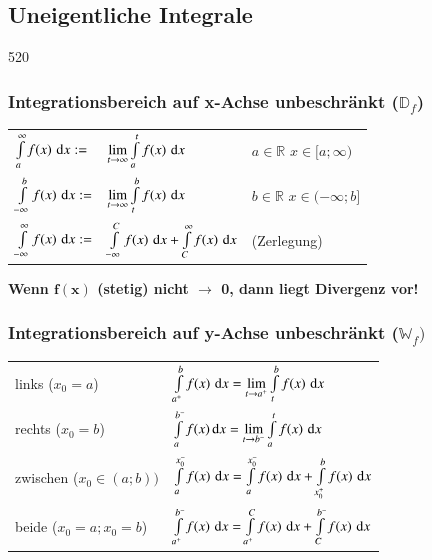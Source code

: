\subsection{Uneigentliche Integrale}{520}

\subsubsection{Integrationsbereich auf x-Achse unbeschränkt ($\mathbb{D}_f$)}

\vspace{-0.2cm}

\renewcommand{\arraystretch}{2.3}
\begin{tabular}{lll}
    $\int \limits_a^{\infty} f(x) \, \mathop{} \! \mathrm{d} x :=$            & $\lim \limits_{t \rightarrow \infty} \int \limits_a^t f(x) \, \mathop{} \! \mathrm{d} x$                    & $a \in \mathbb{R}$ \quad $x \in [a; \infty)$      \\
    $\int \limits_{- \infty}^{b} f(x) \, \mathop{} \! \mathrm{d} x :=$        & $\lim \limits_{t \rightarrow \infty} \int \limits_t^b f(x) \, \mathop{} \! \mathrm{d} x$                    & $b \in \mathbb{R}$ \quad $x \in (- \infty; b]$    \\
    $\int \limits_{- \infty}^{\infty} f(x) \, \mathop{} \! \mathrm{d} x :=$   & $\int \limits_{- \infty}^{C} f(x) \, \mathop{} \! \mathrm{d} x + \int \limits_{C}^{\infty} f(x) \, \mathop{} \! \mathrm{d} x$ & (Zerlegung)
\end{tabular}
\renewcommand{\arraystretch}{1}

\textbf{Wenn $\bm{f(x)}$ (stetig) nicht $\bm{\rightarrow}$ 0, dann liegt Divergenz vor!}


\subsubsection{Integrationsbereich auf y-Achse unbeschränkt ($\mathbb{W}_f)$}

\vspace{-0.2cm}

\renewcommand{\arraystretch}{2.7}
\begin{tabular}{ll}
    links ($x_0 = a$)           & $\int \limits_{a^+}^{b} f(x) \, \mathop{} \! \mathrm{d} x = \lim \limits_{t \to a^+} \int \limits_t^b f(x) \, \mathop{} \! \mathrm{d} x$                              \\
    rechts ($x_0 = b$)          & $\int \limits_{a}^{b^-} f(x) \mathop{} \! \mathrm{d} x = \lim \limits_{t \to b^-} \int \limits_a^t f(x) \, \mathop{} \! \mathrm{d} x$                                 \\
    zwischen ($x_0 \in (a;b))$  & $\int \limits_{a}^{x_0^-} f(x) \, \mathop{} \! \mathrm{d} x = \int \limits_{a}^{x_0^-} f(x) \, \mathop{} \! \mathrm{d} x + \int \limits_{x_0^+}^{b} f(x) \, \mathop{} \! \mathrm{d} x$  \\
    beide ($x_0 = a; x_0 = b$)  & $\int \limits_{a^+}^{b^-} f(x) \, \mathop{} \! \mathrm{d} x = \int \limits_{a^+}^{C} f(x) \, \mathop{} \! \mathrm{d} x + \int \limits_{C}^{b^-} f(x) \, \mathop{} \! \mathrm{d} x$ 
\end{tabular}
\renewcommand{\arraystretch}{1}

